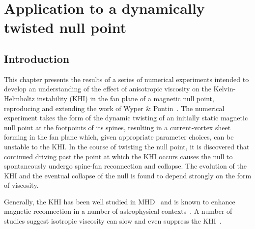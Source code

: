 \chapter{Application to a dynamically twisted null point}
\label{chp:null_point_khi}

\graphicspath{{images/null_point_khi/}}

\section{Introduction}

This chapter presents the results of a series of numerical experiments intended to develop an understanding of the effect of anisotropic viscosity on the Kelvin-Helmholtz instability (KHI) in the fan plane of a magnetic null point, reproducing and extending the work of Wyper \& Pontin~\cite{wyperKelvinHelmholtzInstabilityCurrentvortex2013}. The numerical experiment takes the form of the dynamic twisting of an initially static magnetic null point at the footpoints of its spines, resulting in a current-vortex sheet forming in the fan plane which, given appropriate parameter choices, can be unstable to the KHI. In the course of twisting the null point, it is discovered that continued driving past the point at which the KHI occurs causes the null to spontaneously undergo spine-fan reconnection and collapse. The evolution of the KHI and the eventual collapse of the null is found to depend strongly on the form of viscosity.

Generally, the KHI has been well studied in MHD~\cite{chandrasekharHydrodynamicHydromagneticStability1981,einaudiResistiveInstabilitiesFlowing1986} and is known to enhance magnetic reconnection in a number of astrophysical contexts~\cite{minEffectsMagneticReconnection1997,kowalKelvinHelmholtzTearingInstability2020}. A number of studies suggest isotropic viscosity can slow and even suppress the KHI~\cite{howsonEffectsResistivityViscosity2017,roedigerViscousKelvinHelmholtzInstabilities2013a,wyperKelvinHelmholtzInstabilityCurrentvortex2013}.

